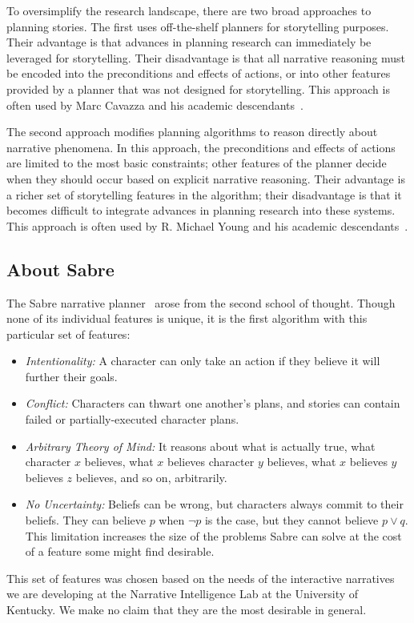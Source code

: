 \documentclass{nilreport}
\begin{document}
To oversimplify the research landscape, there are two broad approaches
to planning stories. The first uses off-the-shelf planners for storytelling
purposes. Their advantage is that advances in planning research can
immediately be leveraged for storytelling. Their disadvantage is that
all narrative reasoning must be encoded into the preconditions and
effects of actions, or into other features provided by a planner that
was not designed for storytelling. This approach is often used by
Marc Cavazza and his academic descendants~\cite{cavazza2002character,porteous2010applying}.

The second approach modifies planning algorithms to reason directly
about narrative phenomena. In this approach, the preconditions and
effects of actions are limited to the most basic constraints; other
features of the planner decide when they should occur based on explicit
narrative reasoning. Their advantage is a richer set of storytelling
features in the algorithm; their disadvantage is that it becomes difficult
to integrate advances in planning research into these systems. This
approach is often used by R. Michael Young and his academic descendants~\cite{young2013plans}.

\subsection{About Sabre}

The Sabre narrative planner~\cite{ware2021sabre} arose from the
second school of thought. Though none of its individual features is
unique, it is the first algorithm with this particular set of features:
\begin{itemize}
\item \emph{Intentionality:} A character can only take an action if they
believe it will further their goals.
\item \emph{Conflict:} Characters can thwart one another's plans, and stories
can contain failed or partially-executed character plans.
\item \emph{Arbitrary Theory of Mind:} It reasons about what is actually
true, what character $x$ believes, what $x$ believes character $y$
believes, what $x$ believes $y$ believes $z$ believes, and so on,
arbitrarily.
\item \emph{No Uncertainty:} Beliefs can be wrong, but characters always
commit to their beliefs. They can believe $p$ when $\neg p$ is the
case, but they cannot believe $p\vee q$. This limitation increases
the size of the problems Sabre can solve at the cost of a feature
some might find desirable.
\end{itemize}
\noindent This set of features was chosen based on the needs of the
interactive narratives we are developing at the Narrative Intelligence
Lab at the University of Kentucky. We make no claim that they are
the most desirable in general.
\end{document}
